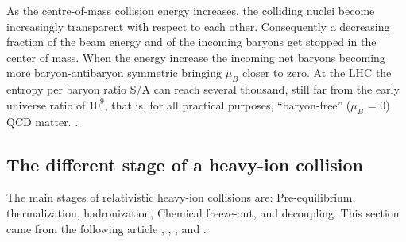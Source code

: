 \documentclass[12pt,a4paper]{book}
\begin{document}
	As the centre-of-mass collision energy increases, the colliding nuclei become increasingly transparent with respect to each other. Consequently a decreasing fraction of the beam energy and of the incoming baryons get stopped in the center of mass. When the energy increase the incoming net baryons becoming more baryon-antibaryon symmetric bringing $\mu_B$ closer to zero. At the LHC the entropy per baryon ratio S/A can reach several thousand, still far from the early universe ratio of $10^9$, that is, for all practical purposes, “baryon-free” ($\mu_B$ = 0) QCD matter.
	\cite{heinz2004conceptsheavyionphysics}.
	
	\subsection{The different stage of a heavy-ion collision}
	The main stages of relativistic heavy-ion collisions are: Pre-equilibrium, thermalization, hadronization, Chemical freeze-out, and	decoupling. This section came from the following article \cite{heinz2004conceptsheavyionphysics}, \cite{Herrmann:2920632}, \cite{Padhan:2924203}, \cite{Arata:2922803} and \cite{amsdottorato9036}.
\end{document}
